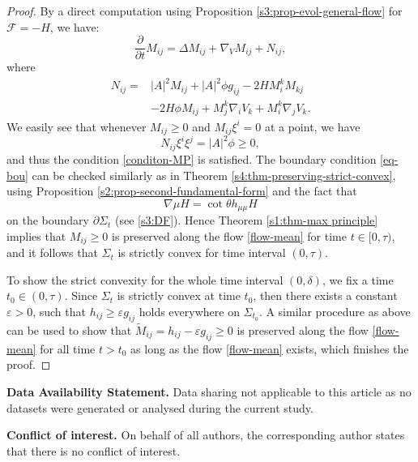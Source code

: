\documentclass[11pt,reqno]{amsart}
\theoremstyle{definition}
\theoremstyle{remark}
\numberwithin{equation}{section}
\renewcommand{\(}{\left(}
\renewcommand{\)}{\right)}
\renewcommand{\-}{\overline}
\begin{document}
\begin{proof}
		By a direct computation using Proposition \ref{s3:prop-evol-general-flow} for $\mathcal{F}=-H$, we have:
		\begin{equation}
			\frac{\partial}{\partial t} M_{ij}=\Delta M_{ij}+\nabla_{V} M_{ij}+N_{ij},
		\end{equation}
		where
		\begin{align*}
			N_{ij}=&|A|^2 M_{ij}+|A|^2\phi g_{ij}-2HM_i^k M_{kj}\nonumber\\
&-2H\phi M_{ij}+M_j^k\nabla_{i}{V_k}+M_i^k\nabla_{j}{V_k}.
		\end{align*}
We easily see that whenever $M_{ij}\geq0$ and $M_{ij}\xi^i=0$ at a point, we have
		\begin{equation}
			N_{ij}\xi^i\xi^j=|A|^2\phi\geq 0,
		\end{equation}
and thus the condition \eqref{conditon-MP} is satisfied. The boundary condition \eqref{eq-bou} can be checked similarly as in Theorem \ref{s4:thm-preserving-strict-convex}, using Proposition \ref{s2:prop-second-fundamental-form} and the fact that
\begin{equation*}
  \nabla\mu H=\cot\theta h_{\mu\mu}H
\end{equation*}
on the boundary $\partial\Sigma_t$ (see \eqref{s3:DF}). Hence Theorem \ref{s1:thm-max principle} implies that $M_{ij}\geq 0$ is preserved along the flow \eqref{flow-mean} for time $t\in[0,\tau)$, and it follows that $\Sigma_t$ is strictly convex for time interval $(0,\tau)$.
		
		To show the strict convexity for the whole time interval $(0,\delta)$, we fix a time $t_0\in(0,\tau)$. Since $\Sigma_t$ is strictly convex at time $t_0$, then there exists a constant $\varepsilon>0$, such that $h_{ij}\geq \varepsilon g_{ij}$ holds everywhere on $\Sigma_{t_0}$. A similar procedure as above can be used to show that $\tilde{M}_{ij}=h_{ij}-\varepsilon g_{ij}\geq 0$ is preserved along the flow \eqref{flow-mean} for all time $t>t_0$ as long as the flow \eqref{flow-mean} exists, which finishes the proof.
	\end{proof}


\noindent\textbf{Data Availability Statement.} Data sharing not applicable to this article as no datasets were generated or
analysed during the current study.

\noindent\textbf{Conflict of interest.} On behalf of all authors, the corresponding author states that there is no conflict of
interest.
\end{document}
